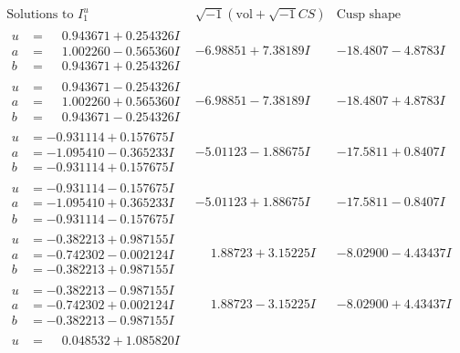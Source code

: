 \documentclass[1p]{elsarticle_modified}
\theoremstyle{definition}
\newcommand{\I}{\sqrt{-1}}
\begin{document}
$$\begin{array}{c|c|c}  
\text{Solutions to }I^u_{1}& \I (\text{vol} + \sqrt{-1}CS) & \text{Cusp shape}\\
 \hline 
\begin{aligned}
u &= \phantom{-}0.943671 + 0.254326 I \\
a &= \phantom{-}1.002260 - 0.565360 I \\
b &= \phantom{-}0.943671 + 0.254326 I\end{aligned}
 & -6.98851 + 7.38189 I & -18.4807 - 4.8783 I \\ \hline\begin{aligned}
u &= \phantom{-}0.943671 - 0.254326 I \\
a &= \phantom{-}1.002260 + 0.565360 I \\
b &= \phantom{-}0.943671 - 0.254326 I\end{aligned}
 & -6.98851 - 7.38189 I & -18.4807 + 4.8783 I \\ \hline\begin{aligned}
u &= -0.931114 + 0.157675 I \\
a &= -1.095410 - 0.365233 I \\
b &= -0.931114 + 0.157675 I\end{aligned}
 & -5.01123 - 1.88675 I & -17.5811 + 0.8407 I \\ \hline\begin{aligned}
u &= -0.931114 - 0.157675 I \\
a &= -1.095410 + 0.365233 I \\
b &= -0.931114 - 0.157675 I\end{aligned}
 & -5.01123 + 1.88675 I & -17.5811 - 0.8407 I \\ \hline\begin{aligned}
u &= -0.382213 + 0.987155 I \\
a &= -0.742302 - 0.002124 I \\
b &= -0.382213 + 0.987155 I\end{aligned}
 & \phantom{-}1.88723 + 3.15225 I & -8.02900 - 4.43437 I \\ \hline\begin{aligned}
u &= -0.382213 - 0.987155 I \\
a &= -0.742302 + 0.002124 I \\
b &= -0.382213 - 0.987155 I\end{aligned}
 & \phantom{-}1.88723 - 3.15225 I & -8.02900 + 4.43437 I \\ \hline\begin{aligned}
u &= \phantom{-}0.048532 + 1.085820 I \\

\end{aligned}
\end{array}$$
\end{document}
